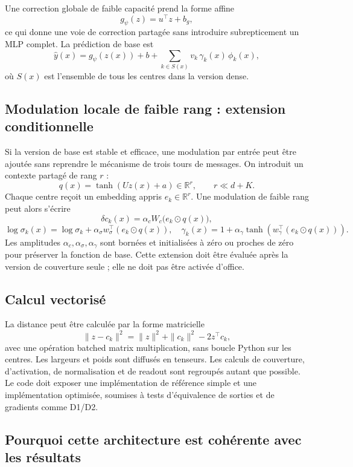 \documentclass[11pt,a4paper]{article}
\newcommand{\R}{\mathbb{R}}
\begin{document}
Une correction globale de faible capacité prend la forme affine
\[
 g_{\psi}(z)=u^\top z+b_g,
\]
ce qui donne une voie de correction partagée sans introduire subrepticement un MLP complet. La prédiction de base est
\[
 \widehat y(x)=g_{\psi}(z(x))+b+
 \sum_{k\in S(x)}v_k\,\gamma_k(x)\,\phi_k(x),
\]
où $S(x)$ est l'ensemble de tous les centres dans la version dense.

\subsection{Modulation locale de faible rang : extension conditionnelle}

Si la version de base est stable et efficace, une modulation par entrée peut être ajoutée sans reprendre le mécanisme de trois tours de messages. On introduit un contexte partagé de rang $r$ :
\[
 q(x)=\tanh(Uz(x)+a)\in\R^r,\qquad r\ll d+K.
\]
Chaque centre reçoit un embedding appris $e_k\in\R^r$. Une modulation de faible rang peut alors s'écrire
\[
 \delta c_k(x)=\alpha_c W_c\bigl(e_k\odot q(x)\bigr),
\]
\[
 \log\sigma_k(x)=\log\sigma_k+
 \alpha_\sigma w_\sigma^\top(e_k\odot q(x)),
\quad
 \gamma_k(x)=1+\alpha_\gamma\tanh\!\left(w_\gamma^\top(e_k\odot q(x))\right).
\]
Les amplitudes $\alpha_c,\alpha_\sigma,\alpha_\gamma$ sont bornées et initialisées à zéro ou proches de zéro pour préserver la fonction de base. Cette extension doit être évaluée après la version de couverture seule ; elle ne doit pas être activée d'office.

\subsection{Calcul vectorisé}

La distance peut être calculée par la forme matricielle
\[
 \|z-c_k\|^2=\|z\|^2+\|c_k\|^2-2z^\top c_k,
\]
avec une opération batched matrix multiplication, sans boucle Python sur les centres. Les largeurs et poids sont diffusés en tenseurs. Les calculs de couverture, d'activation, de normalisation et de readout sont regroupés autant que possible. Le code doit exposer une implémentation de référence simple et une implémentation optimisée, soumises à tests d'équivalence de sorties et de gradients comme D1/D2.

\subsection{Pourquoi cette architecture est cohérente avec les résultats}
\end{document}
